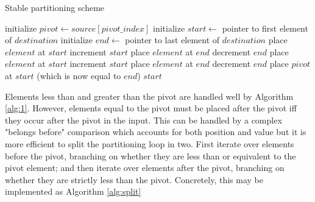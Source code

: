 \documentclass{juliacon}
\begin{document}
\begin{algorithm}[h]
\caption{Stable partitioning scheme}\label{alg:split}
\begin{algorithmic}[1]
    \State initialize $pivot \leftarrow source[pivot\_index]$
    \State initialize $start \leftarrow$ pointer to first element of $destination$
    \State initialize $end \leftarrow$ pointer to  last element of $destination$
        \State place $element$ at $start$
        \State increment $start$
      \Else
        \State place $element$ at $end$
        \State decrement $end$
      \EndIf
    \EndFor
        \State place $element$ at $start$
        \State increment $start$
      \Else
        \State place $element$ at $end$
        \State decrement $end$
      \EndIf
    \EndFor
    \State place $pivot$ at $start$ (which is now equal to $end$)
    \State \Return $start$
  \EndProcedure
\end{algorithmic}
\end{algorithm}

Elements less than and greater than the pivot are handled well by Algorithm \ref{alg:1}. However, elements equal to the pivot must be placed after the pivot iff they occur after the pivot in the input. This can be handled by a complex "belongs before" comparison which accounts for both position and value but it is more efficient to split the partitioning loop in two. First iterate over elements before the pivot, branching on whether they are less than or equivalent to the pivot element; and then iterate over elements after the pivot, branching on whether they are strictly less than the pivot. Concretely, this may be implemented as Algorithm \ref{alg:split}


\end{document}
